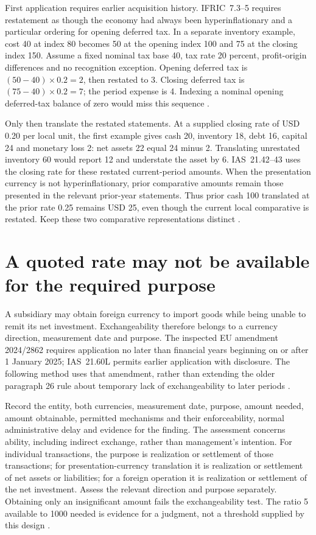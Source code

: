 First application requires earlier acquisition history. IFRIC~7.3--5
requires restatement as though the economy had always been hyperinflationary
and a particular ordering for opening deferred tax. In a separate
inventory example, cost 40 at index 80 becomes 50 at the opening index 100
and 75 at the closing index 150. Assume a fixed nominal tax base 40, tax
rate 20 percent, profit-origin differences and no recognition exception.
Opening deferred tax is \((50-40)\times0.2=2\), then restated to 3.
Closing deferred tax is \((75-40)\times0.2=7\); the period expense is 4.
Indexing a nominal opening deferred-tax balance of zero would miss this
sequence \citep[IFRIC~7.3--5; IAS~29.32]{eu20231803}.

Only then translate the restated statements. At a supplied closing rate of
USD 0.20 per local unit, the first example gives cash 20, inventory 18, debt 16,
capital 24 and monetary loss 2: net assets 22 equal 24 minus 2. Translating
unrestated inventory 60 would report 12 and understate the asset by 6.
IAS~21.42--43 uses the closing rate for these restated current-period amounts.
When the presentation currency is not hyperinflationary, prior comparative
amounts remain those presented in the relevant prior-year statements. Thus
prior cash 100 translated at the prior rate 0.25 remains USD 25, even though
the current local comparative is restated. Keep these two comparative
representations distinct \citep[IAS~21.42--47; IAS~29.34--36]{eu20231803}.

\section{A quoted rate may not be available for the required purpose}
\label{sec:group-exchangeability}

A subsidiary may obtain foreign currency to import goods while being unable
to remit its net investment. Exchangeability therefore belongs to a currency
direction, measurement date and purpose. The inspected EU amendment 2024/2862
requires application no later than financial years beginning on or after
1 January 2025; IAS~21.60L permits earlier application with disclosure.
The following method uses that amendment, rather than extending the older
paragraph 26 rule about temporary lack of exchangeability to later periods
\citep[Article~2; IAS~21.8--8B, 19A, 26, 60L--M]{eu20242862}.

Record the entity, both currencies, measurement date, purpose, amount needed,
amount obtainable, permitted mechanisms and their enforceability, normal
administrative delay and evidence for the finding. The assessment concerns
ability, including indirect exchange, rather than management's intention.
For individual transactions, the purpose is realization or settlement of
those transactions; for presentation-currency translation it is realization
or settlement of net assets or liabilities; for a foreign operation it is
realization or settlement of the net investment. Assess the relevant direction
and purpose separately. Obtaining only an insignificant amount fails the
exchangeability test. The ratio 5 available to 1000 needed is evidence for a
judgment, not a threshold supplied by this design
\citep[IAS~21.A2--A10]{eu20242862}.

